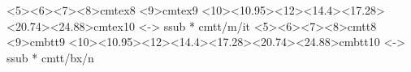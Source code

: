 %
%
\makeatletter
{}%
  {%
   \newcommand\SkipToFmtEnd{}%
   \newcommand\EndFmtInput{}%
   \long\def\SkipToFmtEnd#1\EndFmtInput{}%
  }\SkipToFmtEnd

\newcommand\ReadOnlyOnce[1]{\@ifundefined{#1}{\@namedef{#1}{}}\SkipToFmtEnd}
\usepackage{amstext}
\usepackage{amssymb}
\usepackage{stmaryrd}
  {<5><6><7><8>cmtex8
   <9>cmtex9
   <10><10.95><12><14.4><17.28><20.74><24.88>cmtex10}{}
  {<-> ssub * cmtt/m/it}{}
\newcommand{\texfamily}{\fontfamily{cmtex}\selectfont}
  {<5><6><7><8>cmtt8
   <9>cmbtt9
   <10><10.95><12><14.4><17.28><20.74><24.88>cmbtt10}{}
  {<-> ssub * cmtt/bx/n}{}
\newcommand{\tex}[1]{\text{\texfamily#1}}	%

\newcommand{\Sp}{\hskip.33334em\relax}


\newcommand{\Conid}[1]{\mathit{#1}}
\newcommand{\Varid}[1]{\mathit{#1}}
\newcommand{\anonymous}{\kern0.06em \vbox{\hrule\@width.5em}}
\newcommand{\plus}{\mathbin{+\!\!\!+}}
\newcommand{\bind}{\mathbin{>\!\!\!>\mkern-6.7mu=}}
\newcommand{\rbind}{\mathbin{=\mkern-6.7mu<\!\!\!<}}%
\newcommand{\sequ}{\mathbin{>\!\!\!>}}
\renewcommand{\leq}{\leqslant}
\renewcommand{\geq}{\geqslant}
\usepackage{polytable}

%
  {\newdimen\mathindent\mathindent\leftmargini}%
  {}%

\def\resethooks{%
  \global\let\SaveRestoreHook\empty
  \global\let\ColumnHook\empty}
\newcommand*{\savecolumns}[1][default]%
  {\g@addto@macro\SaveRestoreHook{\savecolumns[#1]}}
\newcommand*{\restorecolumns}[1][default]%
  {\g@addto@macro\SaveRestoreHook{\restorecolumns[#1]}}
\newcommand*{\aligncolumn}[2]%
  {\g@addto@macro\ColumnHook{\column{#1}{#2}}}

\resethooks

\newcommand{\onelinecommentchars}{\quad-{}- }
\newcommand{\commentbeginchars}{\enskip\{-}
\newcommand{\commentendchars}{-\}\enskip}

\newcommand{\visiblecomments}{%
  \let\onelinecomment=\onelinecommentchars
  \let\commentbegin=\commentbeginchars
  \let\commentend=\commentendchars}

\newcommand{\invisiblecomments}{%
  \let\onelinecomment=\empty
  \let\commentbegin=\empty
  \let\commentend=\empty}

